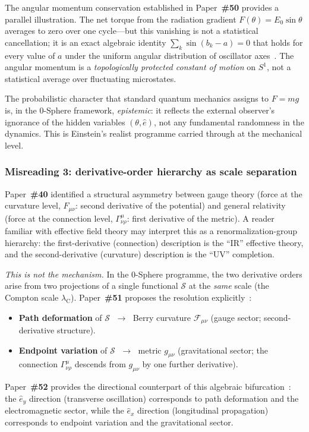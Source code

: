 \documentclass[12pt,letterpaper]{article}
\newcommand{\paperno}[1]{\textbf{\#{}#1}}
\newcommand{\lambdaC}{\lambda_{\mathrm{C}}}
\newcommand{\calS}{\mathcal{S}}
\newcommand{\iphase}{\theta}
\newcommand{\ehat}[1]{\hat{e}_{#1}}
\begin{document}
The angular momentum conservation established in Paper~\paperno{50}
provides a parallel illustration.
The net torque from the radiation gradient $F(\iphase)=E_0\sin\iphase$
averages to zero over one cycle---but this vanishing is not a statistical
cancellation; it is an exact algebraic identity
$\sum_k\sin(b_k - a) = 0$ that holds for every value of $a$
under the uniform angular distribution of oscillator axes~\cite{hanamura50}.
The angular momentum is a \emph{topologically protected constant of motion}
on $S^1$, not a statistical average over fluctuating microstates.

The probabilistic character that standard quantum mechanics assigns to
$F = mg$ is, in the 0-Sphere framework, \emph{epistemic}:
it reflects the external observer's ignorance of the hidden variables
$(\iphase, \hat{e})$, not any fundamental randomness in the dynamics.
This is Einstein's realist programme carried through at the mechanical level.

\subsubsection{Misreading 3: derivative-order hierarchy as scale separation}

Paper~\paperno{40} identified a structural asymmetry between gauge theory
(force at the curvature level, $F_{\mu\nu}$: second derivative of the potential)
and general relativity (force at the connection level, $\Gamma^\mu_{\nu\rho}$:
first derivative of the metric).
A reader familiar with effective field theory may interpret this as a
renormalization-group hierarchy: the first-derivative (connection) description
is the ``IR'' effective theory, and the second-derivative (curvature)
description is the ``UV'' completion.

\emph{This is not the mechanism.}
In the 0-Sphere programme, the two derivative orders arise from
two projections of a single functional $\calS$ at the \emph{same} scale
(the Compton scale $\lambdaC$).
Paper~\paperno{51} proposes the resolution explicitly~\cite{hanamura51}:
\begin{itemize}[leftmargin=2em, itemsep=4pt]
  \item \textbf{Path deformation} of $\calS$
        $\;\longrightarrow\;$ Berry curvature $\mathcal{F}_{\mu\nu}$
        (gauge sector; second-derivative structure).
  \item \textbf{Endpoint variation} of $\calS$
        $\;\longrightarrow\;$ metric $g_{\mu\nu}$
        (gravitational sector; the connection $\Gamma^\mu_{\nu\rho}$
        descends from $g_{\mu\nu}$ by one further derivative).
\end{itemize}
Paper~\paperno{52} provides the directional counterpart of this algebraic
bifurcation~\cite{hanamura52}: the $\ehat{y}$ direction (transverse oscillation)
corresponds to path deformation and the electromagnetic sector,
while the $\ehat{x}$ direction (longitudinal propagation) corresponds to
endpoint variation and the gravitational sector.
\end{document}
